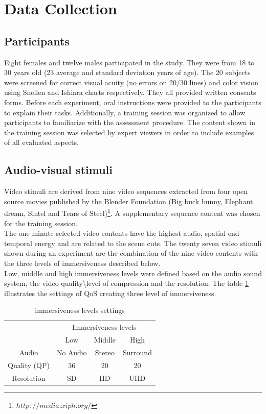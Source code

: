 \section{Data Collection}

\subsection{Participants}
Eight females and twelve males participated in the study. They were from 18 to 30 years old (23 average and standard deviation years of age). The 20 subjects were screened for correct visual acuity (no errors on 20/30 lines) and color vision using Snellen and Ishiara charts respectively. They all provided written consents forms. Before each experiment, oral instructions were provided to the participants to explain their tasks. Additionally, a training session was organized to allow participants to familiarize with the assessment procedure. The content shown in the training session was selected by expert viewers in order to include examples of all evaluated aspects.

\subsection{Audio-visual stimuli}
Video stimuli are derived from nine video sequences extracted from four open source movies published by the Blender Foundation (Big buck bunny, Elephant dream, Sintel and Tears of Steel)\footnote{$http://media.xiph.org/$}. A supplementary sequence content was chosen for the training session.
\\The one-minute selected video contents have the highest audio, spatial end temporal energy and are related to the scene cuts.
The twenty seven video stimuli shown during an experiment are the combination of the nine video contents with the three levels of immersiveness described below.
\\Low, middle and high immersiveness levels were defined based on the audio sound system, the video quality\textbackslash level of compression and the resolution.
The table \ref{IL} illustrates the settings of \ac{QoS} creating three level of immersiveness.

\begin{table}[h]
\begin{tabular}{ |c || c | c | c | }
   \hline	
  						& \multicolumn{3}{c|}{Immersiveness levels} \\ \cline{2-4}
   					 	& Low 			& Middle 		& High \\
   \hline	
   Audio 				& No Audio 		& Stereo		& Surround \\
   Quality (QP) 		& 36 			& 20			& 20 \\
   Resolution			& SD			& HD			& UHD\\
   \hline	
 \end{tabular}
 \caption{immersiveness levels settings}
 \label{IL}
 \end{table}

